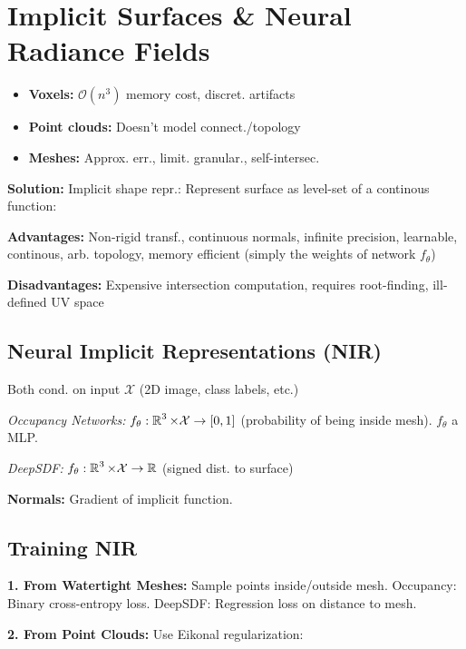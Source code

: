 \section{Implicit Surfaces \& Neural Radiance Fields}

\begin{itemize}
    \item \textbf{Voxels:} $\mathcal{O}(n^3)$ memory cost, discret. artifacts
    \item \textbf{Point clouds:} Doesn't model connect./topology
    \item \textbf{Meshes:} Approx. err., limit. granular., self-intersec.
\end{itemize}

\textbf{Solution:} Implicit shape repr.: Represent surface as level-set of a continous function:

\textbf{Advantages:} Non-rigid transf., continuous normals, infinite precision, learnable, continous, arb. topology, memory efficient (simply the weights of network $f_\theta$)

\textbf{Disadvantages:} Expensive intersection computation, requires root-finding, ill-defined UV space

\subsection{Neural Implicit Representations (NIR)}

Both cond. on input $\mathcal{X}$ (2D image, class labels, etc.)

\emph{Occupancy Networks:} $f_\theta: \operatorname{\mathbb{R}}^3 \times \mathcal{X} \to [0,1]$ (probability of being inside mesh). $f_\theta$ a MLP.

\emph{DeepSDF:} $f_\theta: \operatorname{\mathbb{R}}^3 \times \mathcal{X} \to \operatorname{\mathbb{R}}$ (signed dist. to surface)

\textbf{Normals:} Gradient of implicit function.

\subsection{Training NIR}

\textbf{1. From Watertight Meshes:} Sample points inside/outside mesh. Occupancy: Binary cross-entropy loss. DeepSDF: Regression loss on distance to mesh.

\textbf{2. From Point Clouds:} Use Eikonal regularization:

